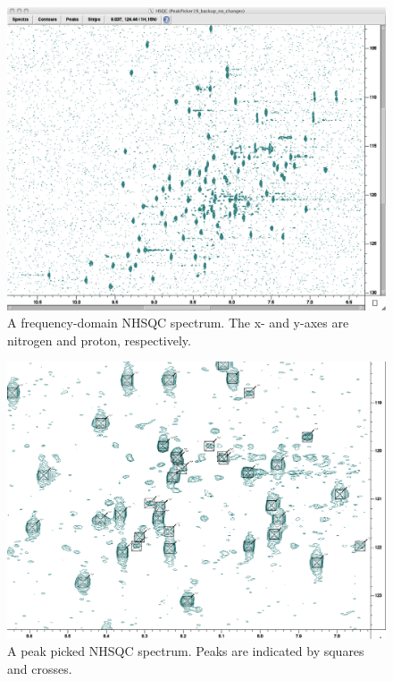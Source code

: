 \begin{figure}
  \includegraphics[scale=0.35]{figures/nhsqc}
  \caption[A frequency-domain NHSQC spectrum.]
          {A frequency-domain NHSQC spectrum. 
           The x- and y-axes are nitrogen and proton, respectively.}
  \label{nhsqc}
\end{figure}

\begin{figure}
  \includegraphics[scale=0.35]{figures/nhsqc_peaks}
  \caption[A peak picked NHSQC spectrum.]
          {A peak picked NHSQC spectrum. 
           Peaks are indicated by squares and crosses.}
  \label{nhsqc_peaks}
\end{figure}

